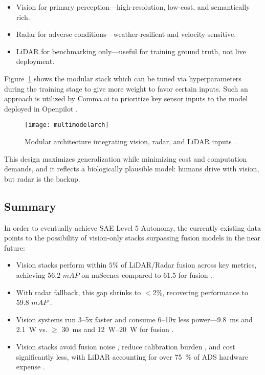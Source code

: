 \documentclass[12pt]{article}
\begin{document}
\begin{itemize}[nosep]
  \item Vision for primary perception—high-resolution, low-cost, and semantically rich.
  \item Radar for adverse conditions—weather-resilient and velocity-sensitive.
  \item LiDAR for benchmarking only—useful for training ground truth, not live deployment.
\end{itemize}
Figure~\ref{fig:multiarch} shows the modular stack which can be tuned via
hyperparameters during the training stage to give more weight to favor certain
inputs. Such an approach is utilized by Comma.ai to prioritize key sensor inputs
to the model deployed in Openpilot \cite{goff2025learningdriveworldmodel}.
\begin{figure}[H]
	\centering
	\texttt{[image: multimodelarch]}
	\caption{Modular architecture integrating vision, radar, and LiDAR inputs \autocite{Hasanujjaman2023}.}
	\label{fig:multiarch}
\end{figure}

This design maximizes generalization while minimizing cost and computation demands, and it reflects a biologically plausible model: humans drive with vision, but radar is the backup.

\subsection{Summary}
In order to eventually achieve SAE Level 5 Autonomy, the currently existing data points to the possibility of vision-only stacks
surpassing fusion models in the near future:
\begin{itemize}
  \item Vision stacks perform within $5\%$ of LiDAR/Radar fusion across key
		metrics, achieving 56.2 $mAP$ on nuScenes compared to 61.5 for fusion \autocite{Zhang2023MultiSensorFusionSurvey}.
  \item With radar fallback, this gap shrinks to $<2\%$, recovering performance
		to 59.8 $mAP$ \autocite{Liao2024RadarVisionFusion}.
  \item Vision systems run 3–5x faster and consume 6–10x less
		power—\SI{9.8}{\milli\second} and \SI{2.1}{\watt} vs. $\geq$ \SI{30}{\milli\second} and \SIrange{12}{20}{\watt} for fusion \autocite{Chen2024EndToEndAD, Rana2023PerceptionSystems}.
  \item Vision stacks avoid fusion noise \autocite{Rana2023PerceptionSystems}, reduce calibration burden \autocite{Han2023FourDRadarSurvey}, and cost significantly less, with LiDAR accounting for over \SI{75}{\percent} of ADS hardware expense \autocite{Shetty2022LiDARvsCamera, Sajjad2021ComparativeDetection}.
\end{itemize}
\end{document}
